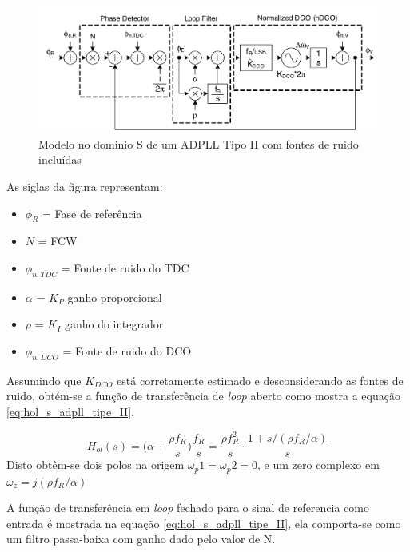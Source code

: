 \begin{figure}[h!]
	\caption{Modelo no dominio S de um ADPLL Tipo II com fontes de ruido incluídas}
	\begin{center}
		\includegraphics[scale=0.6]{img/adpll_type_II_s_domain.png}
	\end{center}
	\label{fig:adpll_type_II_s_domain}
\end{figure}

As siglas da figura representam:

\begin{itemize}
	\item $\phi_{R}$ = Fase de referência
	\item $N$ = FCW
	\item $\phi_{n,TDC}$ = Fonte de ruido do TDC
	\item $\alpha$ = $K_P$ ganho proporcional
	\item $\rho$ = $K_I$ ganho do integrador
	\item $\phi_{n,DCO}$ = Fonte de ruido do DCO
\end{itemize}

Assumindo que $K_{DCO}$ está corretamente estimado e desconsiderando as fontes de ruido, obtém-se a função de transferência de \textit{loop} aberto como mostra a equação \ref{eq:hol_s_adpll_tipe_II}.

	\begin{equation}
	H_{ol}(s) = \big( \alpha + \frac{\rho f_R}{s} \big) \frac{f_R}{s} = \frac{\rho f_R^2}{s} \cdot \frac{1 + s/(\rho f_R / \alpha)}{s}
	\label{eq:hol_s_adpll_tipe_II}
	\end{equation}
Disto obtêm-se dois polos na origem $\omega_p1 = \omega_p2 = 0$, e um zero complexo em $\omega_z = j(\rho f_R / \alpha) $

A função de transferência em \textit{loop} fechado para o sinal de referencia como entrada é mostrada na equação \ref{eq:hol_s_adpll_tipe_II}, ela comporta-se como um filtro passa-baixa com ganho dado pelo valor de N.


